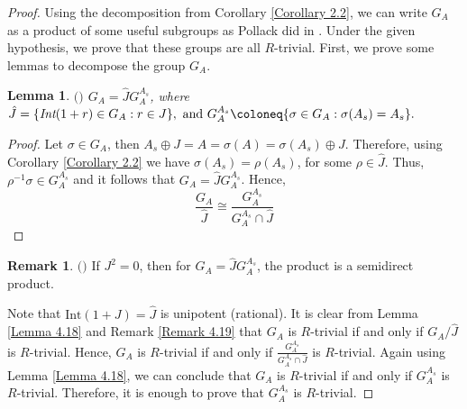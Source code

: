 \documentclass[12pt]{amsart}
\newtheorem{lemma}[theorem]{Lemma}
\theoremstyle{definition}
\newtheorem{remark}[theorem]{Remark}
\numberwithin{equation}{section}
\begin{document}
\begin{proof}
Using the decomposition from Corollary \ref{Corollary 2.2}, we can write $G_A$ as a product of some useful subgroups as Pollack did in \cite{Pollack}. Under the given hypothesis, we prove that these groups are all $R$-trivial. First, we prove some lemmas to decompose the group $G_A$.

\vskip2mm
\begin{lemma}\label{Lemma 4.21}$($\cite{Pollack}$)$
$G_A=\hat{J}G_{A}^{A_s}$, where $\hat{J}=\{\emph{Int}(1+r)\in G_A : r\in J\},\text{ and } G_{A}^{A_s}\coloneq\{\sigma \in G_A: \sigma(A_s)=A_s\}.$
\end{lemma}

\vskip1mm
\begin{proof}
Let $\sigma \in G_A$, then $A_s\oplus J=A=\sigma(A)=\sigma(A_s)\oplus J$. Therefore, using Corollary \ref{Corollary 2.2} we have $\sigma(A_s)=\rho(A_s)$, for some $\rho \in \hat{J}$. Thus, $\rho^{-1}\sigma\in G_{A}^{A_{s}}$ and it follows that $G_A=\hat{J}G_{A}^{A_s}$. Hence, \begin{equation*}\label{eq10}
\displaystyle\frac{G_A}{\hat{J}}\cong \displaystyle\frac{G_{A}^{A_s}}{G_{A}^{A_s}\cap \hat{J}}
\end{equation*}
\end{proof}

\vskip2mm

\begin{remark}\label{Remark 4.22}$($\cite{Pollack}$)$
If $J^2=0$, then for $G_A=\hat{J}G_{A}^{A_s}$, the product is a semidirect product.
\end{remark}

\vskip4mm
\noindent
Note that $\text{Int}(1+J)=\hat{J}$ is unipotent (rational). It is clear from Lemma \ref{Lemma 4.18} and Remark \ref{Remark 4.19} that $G_A$ is $R$-trivial if and only if $G_A/\hat{J}$ is $R$-trivial. Hence, $G_A$ is $R$-trivial if and only if $\displaystyle\frac{G_{A}^{A_s}}{G_{A}^{A_s}\cap \hat{J}}$ is $R$-trivial. Again using Lemma \ref{Lemma 4.18}, we can conclude that $G_A$ is $R$-trivial if and only if $G_{A}^{A_s}$ is $R$-trivial. Therefore, it is enough to prove that $G_{A}^{A_s}$ is $R$-trivial.


\end{proof}
\end{document}
